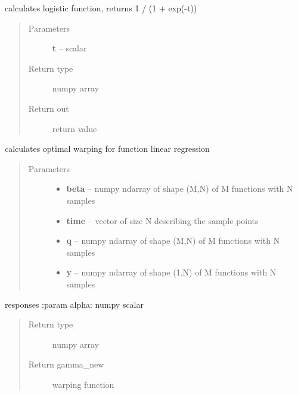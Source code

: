 \documentclass[letterpaper,10pt,english]{sphinxmanual}
\begin{document}
\begin{fulllineitems}
\label{regression:regression.phi}
calculates logistic function, returns 1 / (1 + exp(-t))
\begin{quote}\begin{description}
\item[{Parameters}] \leavevmode
\textbf{t} -- scalar

\item[{Return type}] \leavevmode
numpy array

\item[{Return out}] \leavevmode
return value

\end{description}\end{quote}

\end{fulllineitems}


\begin{fulllineitems}
\label{regression:regression.regression_warp}
calculates optimal warping for function linear regression
\begin{quote}\begin{description}
\item[{Parameters}] \leavevmode\begin{itemize}
\item {} 
\textbf{beta} -- numpy ndarray of shape (M,N) of M functions with N samples

\item {} 
\textbf{time} -- vector of size N describing the sample points

\item {} 
\textbf{q} -- numpy ndarray of shape (M,N) of M functions with N samples

\item {} 
\textbf{y} -- numpy ndarray of shape (1,N) of M functions with N samples

\end{itemize}

\end{description}\end{quote}

responses
:param alpha: numpy scalar
\begin{quote}\begin{description}
\item[{Return type}] \leavevmode
numpy array

\item[{Return gamma\_new}] \leavevmode
warping function

\end{description}\end{quote}

\end{fulllineitems}
\end{document}
